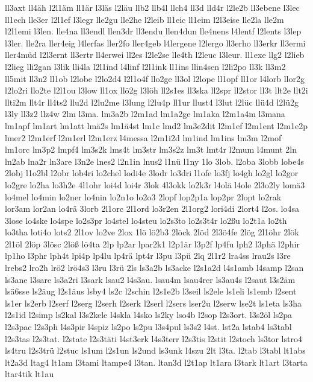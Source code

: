 {ll3axt
ll4äh
l2l1äm
ll1är
l3läs
l2läu
llb2
llb4l
llch4
ll3d
lld4r
l2le2b
ll3ebene
l3lec
ll1ech
lle3er
l2l1ef
l3legr
lle2gu
lle2he
l2leib
ll1eic
ll1eim
l2l3eise
lle2la
lle2m
l2l1emi
l3len.
lle4na
ll3endl
llen3dr
ll3endu
llen4dun
lle4nens
l4lentf
l2lents
l3lep
l3ler.
lle2ra
ller4eig
l4lerfas
ller2fo
ller4geb
l4lergene
l2lergo
ll3erho
ll3erkr
ll3ermi
ller4müd
l2l3ernt
ll3ertr
ll4erwei
ll2es
l2le2se
lle4th
l2leuc
l3leur.
ll1exe
llg2
l2lieb
l2lieg
lli2gan
l3lik
lli4la
l2l1ind
l4linf
l2l1ink
ll1ins
llin4sen
l2li2po
ll3k
ll3m2
ll5mit
ll3n2
ll1ob
l2lobe
l2lo2d4
l2l1o4f
llo2ge
ll3ol
l2lope
ll1opf
ll1or
l4lorb
llor2g
l2lo2ri
llo2te
l2l1ou
l3low
ll1ox
llö2g
l3löh
ll2s1es
ll3ska
ll2spr
ll2stor
ll3t
llt2e
llt2i
llti2m
llt4r
ll4ts2
llu2d
l2lu2me
l3lung
l2lu4p
ll1ur
llust4
l3lut
l2lüc
llü4d
l2lü2g
l3ly
ll3z2
llz4w
2lm
l3ma.
lm3a2b
l2m1ad
lm1a2ge
lm1aka
l2m1a4m
l3mana
lm1apf
lm1art
lm1att
lmä2s
lm1ä4st
lm1c
lmd2
lm3e2dit
l2m1ef
l2m1ent
l2m1e2p
lmer2
l2m1erf
l2m1erl
l2m1erz
l4messa
l2m1i2d
lm1ind
lm1ins
lm3m
l2mof
lm1orc
lm3p2
lmpf4
lm3s2k
lms4t
lm3str
lm3s2z
lm3t
lmt4r
l2mum
l4munt
2ln
ln2ab
lna2r
ln3are
l3n2e
lnes2
l2n1in
lnus2
l1nü
l1ny
1lo
3lob.
l2oba
3lobb
lobe4s
2lobj
l1o2bl
l2obr
lob4ri
lo2chel
lodi4e
3lodr
lo3dri
l1ofe
lo3fj
lo4gh
lo2gl
lo2gor
lo2gre
lo2ha
lo3h2e
4l1ohr
loi4d
loi4r
3lok
4l3okk
lo2k3r
l4olä
l4ole
2l3o2ly
lomä3
lo4mel
lo4min
lo2ner
lo4nin
lo2n1o
lo2o3
2lopf
lop2p1a
lop2pr
2lopt
lo2rak
lor3am
lor2an
lo4rä
3lorb
2l1orc
2l1ord
lo3r2en
2l1org2
lori4di
2lort4
l2os.
lo4sa
3lose
lo4ske
lo4spe
lo2s3pr
lo4stel
lo4steu
lo2s3to
lo2s3t4r
lo2ßu
lo2t1a
lo2th
lo3tha
loti4o
lots2
2l1ov
lo2ve
2lox
1lö
lö2b3
2löck
2löd
2l3ö4fe
2lög
2l1öhr
2lök
2l1öl
2löp
3lösc
2löß
lö4ta
2lp
lp2ar
lpar2k1
l2p1är
l3p2f
lp4fu
lph2
l3phä
l2phir
lp1ho
l3phr
lph4t
lpi4p
lp4lu
lp4rä
lpt4r
l3pu
l3pü
2lq
2l1r2
lra4ss
lrau2s
l3re
lrebs2
lro2h
lrö2
lrö4s3
l3ru
l3rü
2ls
ls3a2b
ls3acke
l2s1a2d
l4s1amb
l4samp
l2san
ls3ane
l3sare
ls3a2ri
l3sark
lsau2
l4s3au.
lsau4m
lsau4rer
ls3au4s
l2saut
l3s2äm
lsä6sse
ls2äug
l2s1äus
lsby4
ls2c
l2schin
l2s1e2b
l3seil
ls2ele
ls1eli
ls1emb
l2sent
ls1er
ls2erb
l2serf
l2serg
l2serh
l2serk
l2serl
l2sers
lser2u
l2serw
lse2t
ls1eta
ls3ha
l2s1id
l2simp
ls2kal
l3s2kele
l4skla
l4sko
ls2ky
lso4b
l2sop
l2s3ort.
l3s2öl
ls2pa
l2s3pac
l2s3ph
l4s3pir
l4spiz
ls2po
ls2pu
l3s4pul
ls3s2
l4st.
lst2a
lstab4
ls3tabl
l2s3tas
l2s3tat.
l2state
l2s3täti
l4st3erk
l4s3terr
l2s3tis
l2stit
l2stoch
ls3tor
lstro4
ls4tru
l2s3trü
l2stuc
ls1um
l2s1un
ls2und
ls3unk
l4szu
2lt
l3ta.
l2tab
l3tabl
lt1abs
lt2a3d
ltag4
lt1am
l3tami
ltampe4
l3tan.
ltan3d
l2t1ap
lt1ara
l3tark
lt1art
l3tarta
ltar4tik
lt1au
}
